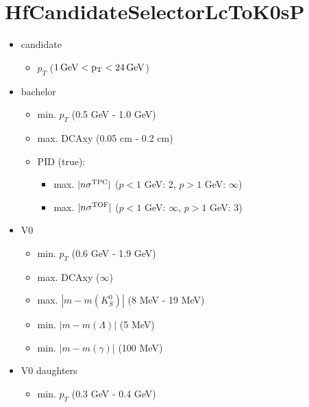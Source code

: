 \documentclass[a4paper,10pt]{article}
\begin{document}
\section{HfCandidateSelectorLcToK0sP}
\begin{itemize}
 \item candidate
 \begin{itemize}
 \item $p_T$ ($1\,\rm{GeV} < p_T < 24\,\rm{GeV}$)
 \end{itemize}
 \item bachelor
 \begin{itemize}
 \item min. $p_T$ (0.5 GeV - 1.0 GeV)
 \item max. DCAxy (0.05 cm - 0.2 cm)
 \item PID (true):
 \begin{itemize}
 \item max. $|n\sigma^{\rm{TPC}}|$ ($p < 1$ GeV: 2, $p>1$ GeV: $\infty$)
 \item max. $|n\sigma^{\rm{TOF}}|$ ($p < 1$ GeV: $\infty$, $p>1$ GeV: 3)
 \end{itemize}
 \end{itemize}
 \item V0
 \begin{itemize}
 \item min. $p_T$ (0.6 GeV - 1.9 GeV)
 \item max. DCAxy ($\infty$)
 \item max. $|m - m(K_S^0)|$ (8 MeV - 19 MeV)
 \item min. $|m - m(\Lambda)|$ (5 MeV)
 \item min. $|m - m(\gamma)|$ (100 MeV)
 \end{itemize}
 \item V0 daughters
 \begin{itemize}
 \item min. $p_T$ (0.3 GeV - 0.4 GeV)
 \end{itemize}
\end{itemize}
\end{document}
